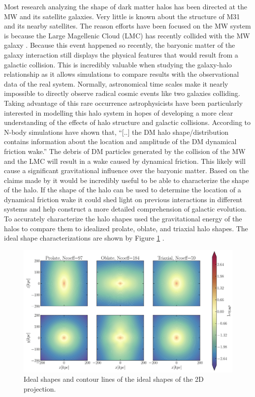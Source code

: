 \documentclass[usenatbib]{mnras}
\begin{document}
Most research analyzing the shape of dark matter halos has been directed at the MW and its satellite galaxies. Very little is known about the structure of M31 and its nearby satellites. The reason efforts have been focused on the MW system is because the Large Magellenic Cloud (LMC) has recently collided with the MW galaxy \citep{Choi_2022}. Because this event happened so recently, the baryonic matter of the galaxy interaction still displays the physical features that would result from a galactic collision. This is incredibly valuable when studying the galaxy-halo relationship as it allows simulations to compare results with the observational data of the real system. Normally, astronomical time scales make it nearly impossible to directly observe radical cosmic events like two galaxies colliding. Taking advantage of this rare occurrence astrophysicists have been particularly interested in modelling this halo system in hopes of developing a more clear understanding of the effects of halo structure and galactic collisions. According to \cite{Garavito-Camargo_2021} N-body simulations have shown that, ``[..] the DM halo shape/distribution contains information about the location and amplitude of the DM dynamical friction wake.'' The debris of DM particles generated by the collision of the MW and the LMC will result in a wake caused by dynamical friction. This likely will cause a significant gravitational influence over the baryonic matter. Based on the claims made by \cite{Garavito-Camargo_2021} it would be incredibly useful to be able to characterize the shape of the halo. If the shape of the halo can be used to determine the location of a dynamical friction wake it could shed light on previous interactions in different systems and help construct a more detailed comprehension of galactic evolution. To accurately characterize the halo shapes \cite{Garavito-Camargo_2021} used the gravitational energy of the halos to compare them to idealized prolate, oblate, and triaxial halo shapes. The ideal shape characterizations are shown by Figure \ref{fig:shapes} \citep{Garavito-Camargo_2021}. 
\begin{figure}
	\includegraphics[width=\columnwidth]{2D_halo_shape.png}
    \caption{Ideal shapes and contour lines of the ideal shapes of the 2D projection.}
    \label{fig:shapes}
\end{figure}
\end{document}
